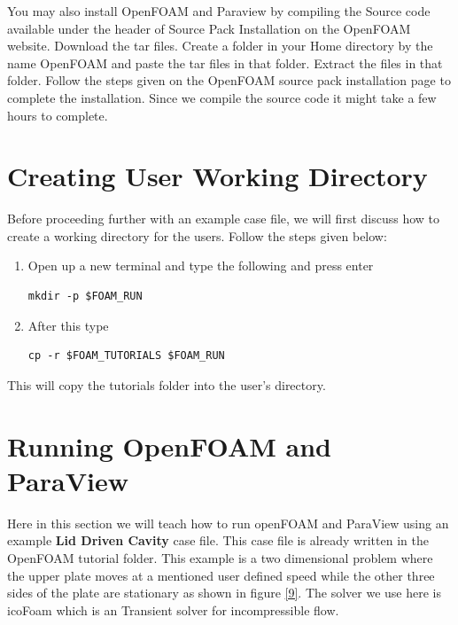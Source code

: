 \documentclass[a4paper,12pt]{report}
\begin{document}
\flushleft You may also install OpenFOAM and Paraview by compiling the Source code available under the header of Source Pack Installation on the OpenFOAM website. Download the tar files. Create a folder in your Home directory by the name OpenFOAM and paste the tar files in that folder. Extract the files in that folder.
\flushleft Follow the steps given on the OpenFOAM source pack installation page to complete the installation. Since we compile the source code it might take a few hours to complete.

\section{Creating User Working Directory}
\flushleft Before proceeding further with an example case file, we will first discuss how to create a working directory for the users.
\flushleft Follow the steps given below:
\begin{enumerate}
\item Open up a new terminal and type the following and press enter
  \begin{lstlisting}[frame=single]
  mkdir -p $FOAM_RUN
  \end{lstlisting}
\item After this type
  \begin{lstlisting}[frame=single]
  cp -r $FOAM_TUTORIALS $FOAM_RUN
  \end{lstlisting}
\end{enumerate}
\flushleft This will copy the tutorials folder into the user's directory.

\section{Running OpenFOAM and ParaView}
\flushleft Here in this section we will teach how to run openFOAM and ParaView using an example \textbf{Lid Driven Cavity} case file. This case file is already written in the OpenFOAM tutorial folder. 
\flushleft This example is a two dimensional problem where the upper plate moves at a mentioned user defined speed while the other three sides of the plate are stationary as shown in figure \ref{9}. The solver we use here is icoFoam which is an Transient solver for incompressible flow.
\end{document}
